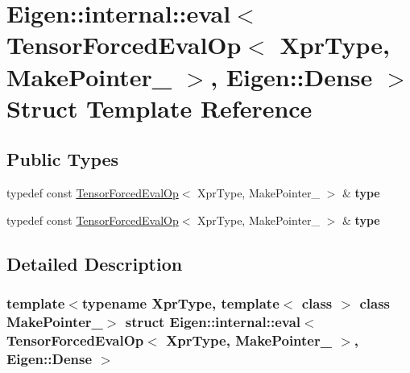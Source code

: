 \hypertarget{struct_eigen_1_1internal_1_1eval_3_01_tensor_forced_eval_op_3_01_xpr_type_00_01_make_pointer___01_4_00_01_eigen_1_1_dense_01_4}{}\section{Eigen\+:\+:internal\+:\+:eval$<$ Tensor\+Forced\+Eval\+Op$<$ Xpr\+Type, Make\+Pointer\+\_\+ $>$, Eigen\+:\+:Dense $>$ Struct Template Reference}
\label{struct_eigen_1_1internal_1_1eval_3_01_tensor_forced_eval_op_3_01_xpr_type_00_01_make_pointer___01_4_00_01_eigen_1_1_dense_01_4}
\subsection*{Public Types}
\begin{DoxyCompactItemize}
\item 
\mbox{\label{struct_eigen_1_1internal_1_1eval_3_01_tensor_forced_eval_op_3_01_xpr_type_00_01_make_pointer___01_4_00_01_eigen_1_1_dense_01_4_ade1b06ed4dc5b7051ff7848c189b7e61}} 
typedef const \hyperlink{class_eigen_1_1_tensor_forced_eval_op}{Tensor\+Forced\+Eval\+Op}$<$ Xpr\+Type, Make\+Pointer\+\_\+ $>$ \& {\bfseries type}
\item 
\mbox{\label{struct_eigen_1_1internal_1_1eval_3_01_tensor_forced_eval_op_3_01_xpr_type_00_01_make_pointer___01_4_00_01_eigen_1_1_dense_01_4_ade1b06ed4dc5b7051ff7848c189b7e61}} 
typedef const \hyperlink{class_eigen_1_1_tensor_forced_eval_op}{Tensor\+Forced\+Eval\+Op}$<$ Xpr\+Type, Make\+Pointer\+\_\+ $>$ \& {\bfseries type}
\end{DoxyCompactItemize}


\subsection{Detailed Description}
\subsubsection*{template$<$typename Xpr\+Type, template$<$ class $>$ class Make\+Pointer\+\_\+$>$\newline
struct Eigen\+::internal\+::eval$<$ Tensor\+Forced\+Eval\+Op$<$ Xpr\+Type, Make\+Pointer\+\_\+ $>$, Eigen\+::\+Dense $>$}



